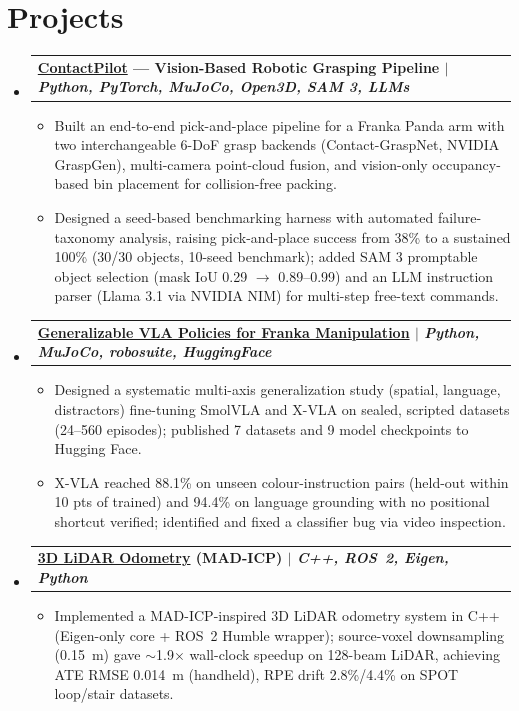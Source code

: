 \documentclass[A4,10.5pt]{article}
\makeatletter
\newcommand{\CVItem}[1]{
  \item\small{
    {#1 \vspace{-2pt}}
  }
}
\newcommand{\CVProject}[2]{
  \vspace{3pt}\item
    \begin{tabular*}{0.97\textwidth}[t]{p{0.9\textwidth}@{\extracolsep{\fill}}r}
      \textbf{#1} & #2 \\
    \end{tabular*}\vspace{0pt}
}
\newcommand{\CVSubHeadingListStart}{\begin{itemize}[leftmargin=0.5cm, label={}]}
\newcommand{\CVSubHeadingListEnd}{\end{itemize}}
\newcommand{\CVItemListStart}{\begin{itemize}}
\newcommand{\CVItemListEnd}{\end{itemize}\vspace{-11pt}}
\makeatother
\begin{document}
\section{Projects}
\CVSubHeadingListStart
    \CVProject
      {\href{https://github.com/VivekSai07/ContactPilot}{ContactPilot} — Vision-Based Robotic Grasping Pipeline $|$ \emph{\small{Python, PyTorch, MuJoCo, Open3D, SAM 3, LLMs}}}{}
    \CVItemListStart
        \CVItem{Built an end-to-end pick-and-place pipeline for a Franka Panda arm with two interchangeable 6-DoF grasp backends (Contact-GraspNet, NVIDIA GraspGen), multi-camera point-cloud fusion, and vision-only occupancy-based bin placement for collision-free packing.}
        \CVItem{Designed a seed-based benchmarking harness with automated failure-taxonomy analysis, raising pick-and-place success from 38\% to a sustained 100\% (30/30 objects, 10-seed benchmark); added SAM 3 promptable object selection (mask IoU 0.29 $\to$ 0.89--0.99) and an LLM instruction parser (Llama 3.1 via NVIDIA NIM) for multi-step free-text commands.}
    \CVItemListEnd
    \CVProject
      {\href{https://github.com/VivekSai07/franka-vla-generalization}{Generalizable VLA Policies for Franka Manipulation} $|$ \emph{\small{Python, MuJoCo, robosuite, HuggingFace}}}{}
    \CVItemListStart
        \CVItem{Designed a systematic multi-axis generalization study (spatial, language, distractors) fine-tuning SmolVLA and X-VLA on sealed, scripted datasets (24--560 episodes); published 7 datasets and 9 model checkpoints to Hugging Face.}
        \CVItem{X-VLA reached 88.1\% on unseen colour-instruction pairs (held-out within 10 pts of trained) and 94.4\% on language grounding with no positional shortcut verified; identified and fixed a classifier bug via video inspection.}
    \CVItemListEnd
    \CVProject
      {\href{https://github.com/VivekSai07/amr_odom}{3D LiDAR Odometry} (MAD-ICP) $|$ \emph{\small{C++, ROS~2, Eigen, Python}}}{}
    \CVItemListStart
        \CVItem{Implemented a MAD-ICP-inspired 3D LiDAR odometry system in C++ (Eigen-only core + ROS~2 Humble wrapper); source-voxel downsampling (0.15~m) gave $\sim$1.9$\times$ wall-clock speedup on 128-beam LiDAR, achieving ATE RMSE 0.014~m (handheld), RPE drift 2.8\%/4.4\% on SPOT loop/stair datasets.}
    \CVItemListEnd
\CVSubHeadingListEnd
    

\vspace{-6pt}
\end{document}
